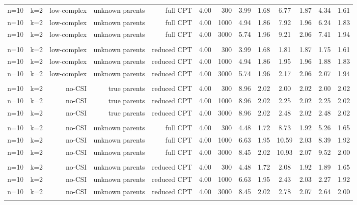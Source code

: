 \begin{table}[ht]
\begin{tabular}{rrrrrrr|cc|cc|cc}
   \\ 
n=10 & k=2 & low-complex & unknown parents & full CPT & 4.00 & 300 & 3.99 & 1.68 & 6.77 & 1.87 & 4.34 & 1.61 \\ 
  n=10 & k=2 & low-complex & unknown parents & full CPT & 4.00 & 1000 & 4.94 & 1.86 & 7.92 & 1.96 & 6.24 & 1.83 \\ 
  n=10 & k=2 & low-complex & unknown parents & full CPT & 4.00 & 3000 & 5.74 & 1.96 & 9.21 & 2.06 & 7.41 & 1.94 \\ 
   \\ 
n=10 & k=2 & low-complex & unknown parents & reduced CPT & 4.00 & 300 & 3.99 & 1.68 & 1.81 & 1.87 & 1.75 & 1.61 \\ 
  n=10 & k=2 & low-complex & unknown parents & reduced CPT & 4.00 & 1000 & 4.94 & 1.86 & 1.95 & 1.96 & 1.88 & 1.83 \\ 
  n=10 & k=2 & low-complex & unknown parents & reduced CPT & 4.00 & 3000 & 5.74 & 1.96 & 2.17 & 2.06 & 2.07 & 1.94 \\ 
   \\ 
n=10 & k=2 & no-CSI & true parents & reduced CPT & 4.00 & 300 & 8.96 & 2.02 & 2.00 & 2.02 & 2.00 & 2.02 \\ 
  n=10 & k=2 & no-CSI & true parents & reduced CPT & 4.00 & 1000 & 8.96 & 2.02 & 2.25 & 2.02 & 2.25 & 2.02 \\ 
  n=10 & k=2 & no-CSI & true parents & reduced CPT & 4.00 & 3000 & 8.96 & 2.02 & 2.48 & 2.02 & 2.48 & 2.02 \\ 
   \\ 
n=10 & k=2 & no-CSI & unknown parents & full CPT & 4.00 & 300 & 4.48 & 1.72 & 8.73 & 1.92 & 5.26 & 1.65 \\ 
  n=10 & k=2 & no-CSI & unknown parents & full CPT & 4.00 & 1000 & 6.63 & 1.95 & 10.59 & 2.03 & 8.39 & 1.92 \\ 
  n=10 & k=2 & no-CSI & unknown parents & full CPT & 4.00 & 3000 & 8.45 & 2.02 & 10.93 & 2.07 & 9.52 & 2.00 \\ 
   \\ 
n=10 & k=2 & no-CSI & unknown parents & reduced CPT & 4.00 & 300 & 4.48 & 1.72 & 2.08 & 1.92 & 1.89 & 1.65 \\ 
  n=10 & k=2 & no-CSI & unknown parents & reduced CPT & 4.00 & 1000 & 6.63 & 1.95 & 2.43 & 2.03 & 2.27 & 1.92 \\ 
  n=10 & k=2 & no-CSI & unknown parents & reduced CPT & 4.00 & 3000 & 8.45 & 2.02 & 2.78 & 2.07 & 2.64 & 2.00 \\ 
   \bottomrule 
 \multicolumn{13}{l}{\scriptsize } 
 \end{tabular}
\end{table}
